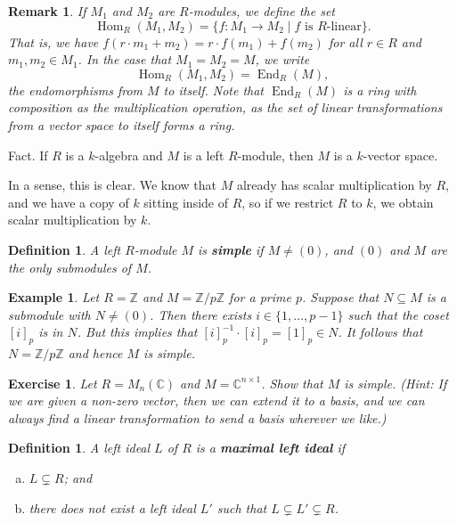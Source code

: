\documentclass[10pt]{article}
\numberwithin{equation}{section}
\newcommand{\C}{\mathbb{C}}
\newcommand{\Z}{\mathbb{Z}}
\DeclareMathOperator{\Hom}{Hom}
\DeclareMathOperator{\End}{End}
\theoremstyle{newstyle}
\newtheorem{remark}[thm]{Remark}
\newtheorem{defn}[thm]{Definition}
\newtheorem{exercise}[thm]{Exercise}
\newtheorem{exmp}[thm]{Example}
\begin{document}
\begin{remark}
If $M_1$ and $M_2$ are $R$-modules, we define the set 
\[ \Hom_R(M_1, M_2) = \{f : M_1 \to M_2 \mid f \text{ is $R$-linear}\}. \]
That is, we have $f(r \cdot m_1 + m_2) = r \cdot f(m_1) + f(m_2)$ for all $r \in R$ and $m_1, m_2 \in M_1$. 
In the case that $M_1 = M_2 = M$, we write 
\[ \Hom_R(M_1, M_2) = \End_R(M), \]
the endomorphisms from $M$ to itself. Note that $\End_R(M)$ is a ring with composition as 
the multiplication operation, as the set of linear transformations from a vector space to itself 
forms a ring. 
\end{remark}

{\sc Fact.} If $R$ is a $k$-algebra and $M$ is a left $R$-module, then $M$ is a $k$-vector space. 

In a sense, this is clear. We know that $M$ already has scalar multiplication by $R$, and we have a 
copy of $k$ sitting inside of $R$, so if we restrict $R$ to $k$, we obtain scalar multiplication by $k$.

\begin{defn}
A left $R$-module $M$ is {\bf simple} if $M \neq (0)$, and $(0)$ and $M$ are the only submodules of $M$.
\end{defn}

\begin{exmp}
Let $R = \Z$ and $M = \Z/p\Z$ for a prime $p$. Suppose that $N \subseteq M$ is a submodule with 
$N \neq (0)$. Then there exists $i \in \{1, \dots, p-1\}$ such that the coset $[i]_p$ is in $N$. 
But this implies that $[i]_p^{-1} \cdot [i]_p = [1]_p \in N$. It follows that $N = \Z/p\Z$ and hence 
$M$ is simple. 
\end{exmp}

\begin{exercise}
Let $R = M_n(\C)$ and $M = \C^{n\times 1}$. Show that $M$ is simple. (Hint: If we are given a 
non-zero vector, then we can extend it to a basis, and we can always find a linear transformation to 
send a basis wherever we like.)
\end{exercise}

\begin{defn}
A left ideal $L$ of $R$ is a {\bf maximal left ideal} if 
\begin{enumerate}[(a)]
    \item $L \subsetneq R$; and
    \item there does not exist a left ideal $L'$ such that $L \subsetneq L' \subsetneq R$. 
\end{enumerate} 
\end{defn}
\end{document}
